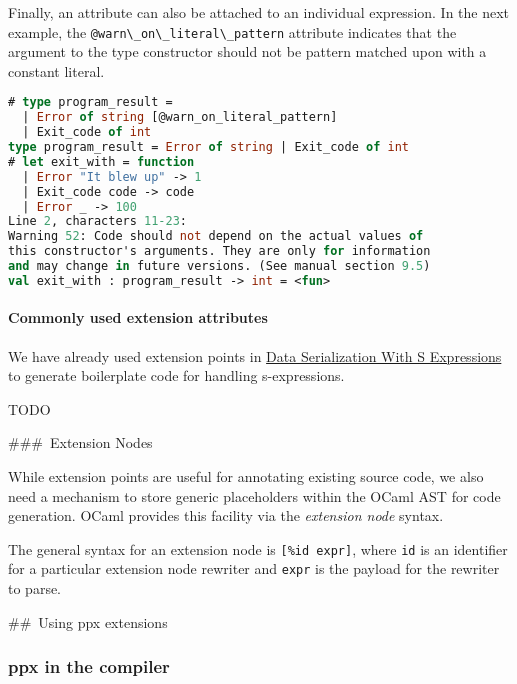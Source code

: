 Finally, an attribute can also be attached to an individual expression.
In the next example, the
\passthrough{\lstinline!@warn\_on\_literal\_pattern!} attribute
indicates that the argument to the type constructor should not be
pattern matched upon with a constant literal.

\begin{lstlisting}[language=Caml]
# type program_result =
  | Error of string [@warn_on_literal_pattern]
  | Exit_code of int
type program_result = Error of string | Exit_code of int
# let exit_with = function
  | Error "It blew up" -> 1
  | Exit_code code -> code
  | Error _ -> 100
Line 2, characters 11-23:
Warning 52: Code should not depend on the actual values of
this constructor's arguments. They are only for information
and may change in future versions. (See manual section 9.5)
val exit_with : program_result -> int = <fun>
\end{lstlisting}

\hypertarget{commonly-used-extension-attributes}{%
\paragraph{Commonly used extension
attributes}\label{commonly-used-extension-attributes}}

We have already used extension points in
\href{data-serialization.html\#data-serialization-with-s-expressions}{Data
Serialization With S Expressions} to generate boilerplate code for
handling s-expressions.

TODO

\#\#\#~Extension Nodes

While extension points are useful for annotating existing source code,
we also need a mechanism to store generic placeholders within the OCaml
AST for code generation. OCaml provides this facility via the
\emph{extension node} syntax.

The general syntax for an extension node is
\passthrough{\lstinline![\%id expr]!}, where
\passthrough{\lstinline!id!} is an identifier for a particular extension
node rewriter and \passthrough{\lstinline!expr!} is the payload for the
rewriter to parse.

\#\#~Using ppx extensions

\hypertarget{ppx-in-the-compiler}{%
\subsubsection{ppx in the compiler}\label{ppx-in-the-compiler}}


